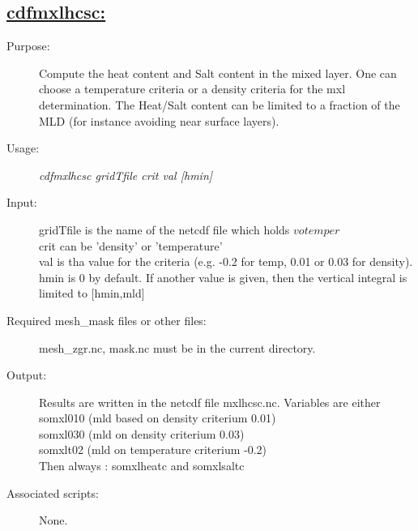 \documentclass[a4paper,11pt]{article}
\begin{document}
\subsection*{\underline{cdfmxlhcsc:}}
\begin{description}
\item[Purpose:] Compute the heat content and Salt content in the mixed layer. One can choose a temperature criteria or a density criteria for the mxl
     determination. The Heat/Salt content can be limited to a fraction of the MLD (for instance avoiding  near surface layers).
\item[Usage:] {\em cdfmxlhcsc gridTfile crit val [hmin] }
\item[Input:] gridTfile is the name of the netcdf file which holds $votemper$  \\
              crit can be 'density' or 'temperature'  \\
              val  is tha value for the criteria (e.g. -0.2 for temp, 0.01 or 0.03 for density). \\
              hmin is 0 by default. If another value is given, then the vertical integral is limited to [hmin,mld] 

\item[Required mesh\_mask files or other files:]    mesh\_zgr.nc, mask.nc must be in the current directory.
\item[Output:] Results are written in the netcdf file mxlhcsc.nc. Variables are either \\
      somxl010 (mld based on density criterium 0.01) \\
      somxl030 (mld on density criterium 0.03) \\
      somxlt02 (mld on temperature criterium -0.2)  \\
Then always : somxlheatc and somxlsaltc
\item[Associated scripts:] {None.}
\end{description}



\newpage
\end{document}
